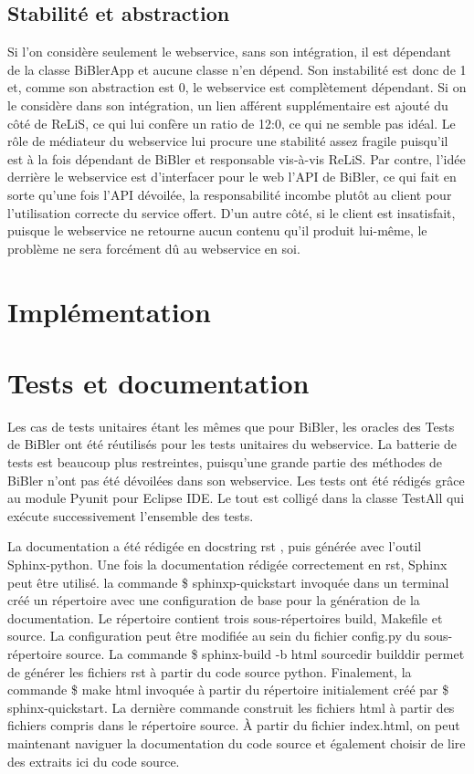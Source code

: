 \documentclass[12pt,titlepage]{article}
\let\oldsection\section
\renewcommand\section{\clearpage\oldsection}
\begin{document}
\subsection{Stabilité et abstraction}
Si l'on considère seulement le webservice, sans son intégration, il est dépendant de la classe BiBlerApp et aucune classe n'en dépend. Son instabilité est donc de 1 et, comme son abstraction est 0, le webservice est complètement dépendant. Si on le considère dans son intégration, un lien afférent supplémentaire est ajouté du côté de ReLiS, ce qui lui confère un ratio de 1\/2:0, ce qui ne semble pas idéal. Le rôle de médiateur du webservice lui procure une stabilité assez fragile puisqu'il est à la fois dépendant de BiBler et responsable vis-à-vis ReLiS. Par contre, l'idée derrière le webservice est d'interfacer pour le web l'API de BiBler, ce qui fait en sorte qu'une fois l'API dévoilée, la responsabilité incombe plutôt au client pour l'utilisation correcte du service offert. D'un autre côté, si le client est insatisfait, puisque le webservice ne retourne aucun contenu qu'il produit lui-même, le problème ne sera forcément dû au webservice en soi. \newline


\section{Implémentation}

\section{Tests et documentation}

Les cas de tests unitaires étant les mêmes que pour BiBler, les oracles des Tests de BiBler ont été réutilisés pour les tests unitaires du webservice. La batterie de tests est beaucoup plus restreintes, puisqu'une grande partie des méthodes de BiBler n'ont pas été dévoilées dans son webservice. Les tests ont été rédigés grâce au module Pyunit pour Eclipse IDE. Le tout est colligé dans la classe TestAll qui exécute successivement l'ensemble des tests. \newline

La documentation a été rédigée en docstring rst \cite{PDGa}, puis générée avec l'outil Sphinx-python. Une fois la documentation rédigée correctement en rst, Sphinx peut être utilisé. la commande \$ sphinxp-quickstart invoquée dans un terminal créé un répertoire avec une configuration de base pour la génération de la documentation. Le répertoire contient trois sous-répertoires build, Makefile et source. La configuration peut être modifiée au sein du fichier config.py du sous-répertoire source. La commande \$ sphinx-build -b html sourcedir builddir permet de générer les fichiers rst à partir du code source python. Finalement, la commande \$ make html invoquée à partir du répertoire initialement créé par \$ sphinx-quickstart. La dernière commande construit les fichiers html à partir des fichiers compris dans le répertoire source. À partir du fichier index.html, on peut maintenant naviguer la documentation du code source et également choisir de lire des extraits ici du code source. 
\end{document}
